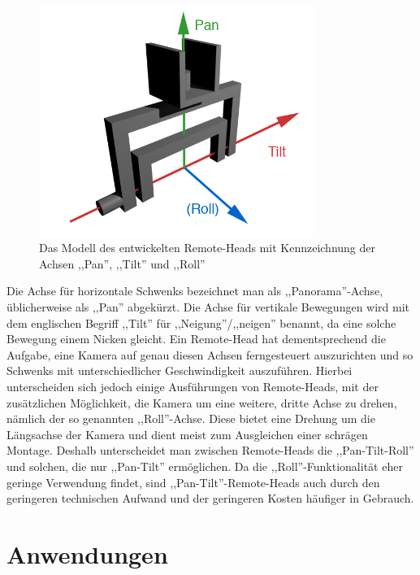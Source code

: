 \documentclass[a4paper, 12pt, bibtotocnumbered, liststotocnumbered]{scrartcl}
\begin{document}
	\begin{figure}[htb]
		\centering
		\includegraphics[width=0.8\textwidth]{Bilder/3D-Remote-Head/3D-Remote-Head}
		\caption{Das Modell des entwickelten Remote-Heads mit Kennzeichnung der Achsen ,,Pan'', ,,Tilt'' und ,,Roll''}
	\end{figure}

	Die Achse für horizontale Schwenks bezeichnet man als ,,Panorama”-Achse, üblicherweise als ,,Pan” abgekürzt. Die Achse für vertikale Bewegungen wird mit dem englischen Begriff ,,Tilt” für ,,Neigung”/,,neigen” benannt, da eine solche Bewegung einem Nicken gleicht.
	Ein Remote-Head hat dementsprechend die Aufgabe, eine Kamera auf genau diesen Achsen ferngesteuert auszurichten und so Schwenks mit unterschiedlicher Geschwindigkeit auszuführen. Hierbei unterscheiden sich jedoch einige Ausführungen von Remote-Heads, mit der zusätzlichen Möglichkeit, die Kamera um eine weitere, dritte Achse zu drehen, nämlich der so genannten ,,Roll”-Achse. Diese bietet eine Drehung um die Längsachse der Kamera und dient meist zum Ausgleichen einer schrägen Montage. Deshalb unterscheidet man zwischen Remote-Heads die ,,Pan-Tilt-Roll” und solchen, die nur ,,Pan-Tilt” ermöglichen. Da die ,,Roll”-Funktionalität eher geringe Verwendung findet, sind ,,Pan-Tilt”-Remote-Heads auch durch den geringeren technischen Aufwand und der geringeren Kosten häufiger in Gebrauch.

	\section{Anwendungen}
\end{document}
